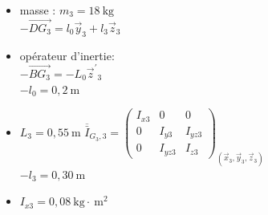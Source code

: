 \documentclass[10pt]{article}
\begin{document}
\begin{itemize}
  \item masse : $m_{3}=18 \mathrm{~kg}$\\
$-\overrightarrow{D G_{3}}=l_{0} \vec{y}_{3}+l_{3} \vec{z}_{3}$
  \item opérateur d'inertie:\\
$-\overrightarrow{B G_{3}}=-L_{0} \vec{z}^{\prime}{ }_{3}$\\
$-l_{0}=0,2 \mathrm{~m}$
  \item $L_{3}=0,55 \mathrm{~m}$ $\overline{\bar{I}}_{G_{3}, 3}=\left(\begin{array}{ccc}I_{x 3} & 0 & 0 \\ 0 & I_{y 3} & I_{y z 3} \\ 0 & I_{y z 3} & I_{z 3}\end{array}\right)_{\left(\vec{x}_{3}, \vec{y}_{3}, \vec{z}_{3}\right)}$\\
$-l_{3}=0,30 \mathrm{~m}$
  \item $I_{x 3}=0,08 \mathrm{~kg} \cdot \mathrm{~m}^{2}$
\end{itemize}
\end{document}
